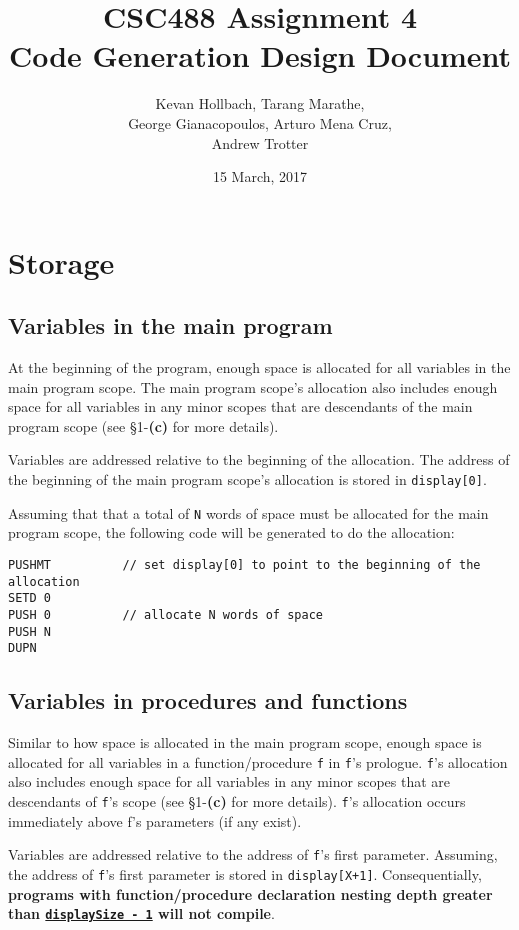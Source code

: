 \documentclass[11pt]{article}
\title{CSC488 Assignment 4 \\ Code Generation Design Document}
\author{Kevan Hollbach, Tarang Marathe, \\ George Gianacopoulos, Arturo Mena Cruz, \\ Andrew Trotter}
\date{15 March, 2017}
\begin{document}
\maketitle

\section{Storage}

\subsection{Variables in the main program}

At the beginning of the program, enough space is allocated for all variables in the main program scope. The main program scope's allocation also includes enough space for all variables in any minor scopes that are descendants of the main program scope (see \S 1-\textbf{(c)} for more details). 

Variables are addressed relative to the beginning of the allocation. The address of the beginning of the main program scope's allocation is stored in \texttt{display[0]}.

Assuming that that a total of \texttt{N} words of space must be allocated for the main program scope, the following code will be generated to do the allocation:

\begin{verbatim}
PUSHMT          // set display[0] to point to the beginning of the allocation
SETD 0
PUSH 0          // allocate N words of space 
PUSH N
DUPN
\end{verbatim}

\subsection{Variables in procedures and functions}

Similar to how space is allocated in the main program scope, enough space is allocated for all variables in a function/procedure \texttt{f} in \texttt{f}'s prologue. \texttt{f}'s allocation also includes enough space for all variables in any minor scopes that are descendants of \texttt{f}'s scope (see \S 1-\textbf{(c)} for more details). \texttt{f}'s allocation occurs immediately above f's parameters (if any exist).

Variables are addressed relative to the address of \texttt{f}'s first parameter. Assuming, the address of \texttt{f}'s first parameter is stored in \texttt{display[X+1]}. Consequentially, \textbf{programs with function/procedure declaration nesting depth greater than \underline{\texttt{displaySize - 1}} will not compile}.
\end{document}
